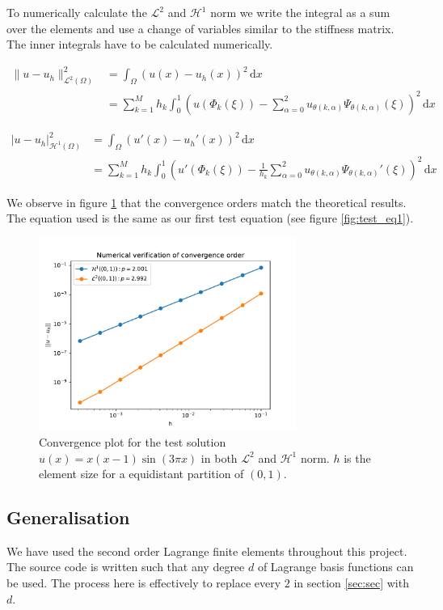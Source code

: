To numerically calculate the \( \mathcal{L}^2 \) and \( \mathcal{H}^1 \) norm
we write the integral as a sum over the elements
and use a change of variables similar to the stiffness matrix.
The inner integrals have to be calculated numerically.

\begin{align}
  \lVert u - u_h \rVert_{\mathcal{L}^2(\Omega)}^2 
    &= \int_{\Omega}(u(x) - u_h(x))^2 \,\mathrm{d}x \\
    &= \sum_{k=1}^{M} h_k \int_{0}^{1}
    \left(
    u(\Phi_k(\xi)) 
      - \sum_{\alpha=0}^{2} u_{\theta(k, \alpha)} \Psi_{\theta(k, \alpha)}(\xi)
    \right)^2 \,\mathrm{d}x
\end{align}

\begin{align}
  \lvert u - u_h \rvert_{\mathcal{H}^1(\Omega)}^2 
    &= \int_{\Omega}(u'(x) - u_h'(x))^2 \,\mathrm{d}x \\
    &= \sum_{k=1}^{M} h_k \int_{0}^{1}
    \left(
    u'(\Phi_k(\xi)) 
      - \frac{1}{h_k} \sum_{\alpha=0}^{2} u_{\theta(k, \alpha)} \Psi_{\theta(k, \alpha)}'(\xi)
    \right)^2 \,\mathrm{d}x
\end{align}

We observe in figure \ref{fig:conv_plot} that the convergence orders
match the theoretical results. The equation used is the same as our
first test equation (see figure \ref{fig:test_eq1}).

\begin{figure}
  \centering
  \includegraphics[width=0.75\textwidth]{Images/plots/task1_conv_plot.pdf}
  \caption{Convergence plot for the test solution
  \( u(x) = x(x-1)\sin(3\pi x) \) in both
  \( \mathcal{L}^2 \) and \( \mathcal{H}^1 \) norm.
\( h \) is the element size for a equidistant partition of \( (0, 1) \).}
  \label{fig:conv_plot}
\end{figure}

\subsection{Generalisation}

We have used the second order Lagrange finite elements
throughout this project. The source code is written
such that any degree \( d \) of Lagrange basis functions can be used.
The process here is effectively to replace every 
\( 2 \) in section \ref{sec:sec} with \( d \).

